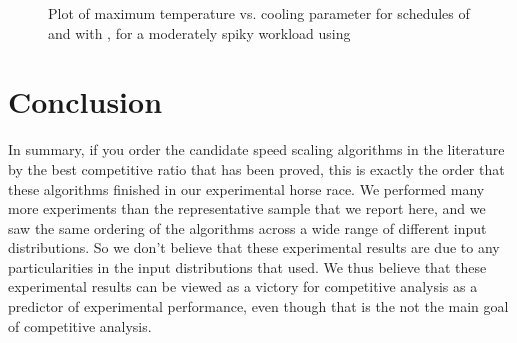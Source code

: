 \documentclass[11pt]{article}
\begin{document}
\begin{figure}
\centering
{}
\caption{Plot of maximum temperature vs. cooling parameter for schedules of   and  with , for a moderately spiky workload using }
\label{fig:temperature_plot}
\end{figure}


\section{Conclusion}


In summary, if you order the 
candidate speed scaling algorithms in the 
literature by the best competitive ratio
that has been proved, this is exactly the order that these
algorithms finished in our experimental horse race.
We performed many more experiments than the 
representative sample that we report here,
and we saw the same ordering of the algorithms
across a wide range of different input distributions.
So we don't believe that these experimental results
are due to any particularities in the input distributions that used.
We thus believe that these experimental results 
can be viewed as a victory for competitive analysis as
a predictor of experimental performance, even though that
is the not the main goal of competitive analysis.








\end{document}
